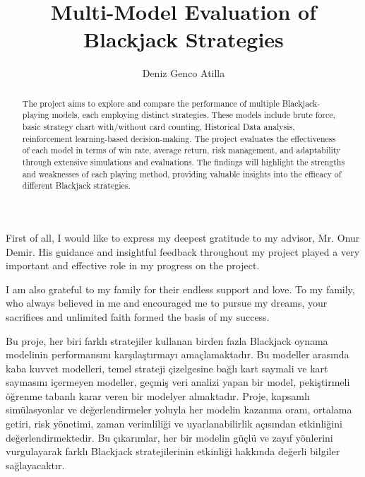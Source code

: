 \documentclass[a4paper,12pt]{report}
\title{Multi-Model Evaluation of Blackjack Strategies}
\author{Deniz Genco Atilla}
\begin{document}


\makecoverpage
    
\clearpage\mbox{}
\clearpage    
\addtocounter{page}{-1}
    
\makeapprovalpage

\begin{acknowledgements}
First of all, I would like to express my deepest gratitude to my advisor, Mr. Onur Demir. His guidance and insightful feedback throughout my project played a very important and effective role in my progress on the project.

I am also grateful to my family for their endless support and love. To my family, who always believed in me and encouraged me to pursue my dreams, your sacrifices and unlimited faith formed the basis of my success.
\end{acknowledgements}

\begin{abstract}
The project aims to explore and compare the performance of multiple Blackjack-playing models, each employing distinct strategies. These models include brute force, basic strategy chart with/without card counting, Historical Data analysis, reinforcement learning-based decision-making. The project evaluates the effectiveness of each model in terms of win rate, average return, risk management, and adaptability through extensive simulations and evaluations. The findings will highlight the strengths and weaknesses of each playing method, providing valuable insights into the efficacy of different Blackjack strategies.
\end{abstract}

\begin{ozet}
Bu proje, her biri farklı stratejiler kullanan birden fazla Blackjack oynama modelinin performansını karşılaştırmayı amaçlamaktadır. Bu modeller arasında kaba kuvvet modelleri, temel strateji çizelgesine bağlı kart saymali ve kart saymasını içermeyen modeller, geçmiş veri analizi yapan bir model, pekiştirmeli öğrenme tabanlı karar veren bir modelyer almaktadır. Proje, kapsamlı simülasyonlar ve değerlendirmeler yoluyla her modelin kazanma oranı, ortalama getiri, risk yönetimi, zaman verimliliği ve uyarlanabilirlik açısından etkinliğini değerlendirmektedir. Bu çıkarımlar, her bir modelin güçlü ve zayıf yönlerini vurgulayarak farklı Blackjack stratejilerinin etkinliği hakkında değerli bilgiler sağlayacaktır.
\end{ozet}
\end{document}
